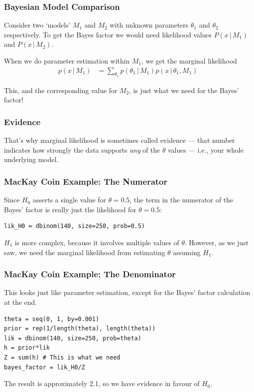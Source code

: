 \documentclass{beamer}
\newcommand{\given}{\,|\,}
\begin{document}
\begin{frame}
\frametitle{Bayesian Model Comparison}
Consider two `models' $M_1$ and $M_2$ with unknown parameters $\theta_1$
and $\theta_2$ respectively. To get the Bayes factor we would need likelihood
values $P(x \given M_1)$ and $P(x \given M_2)$.\\[0.5em]\pause

When we do parameter estimation within $M_1$, we get the marginal likelihood
\begin{align}
p(x \given M_1) &= \sum_{\theta_1} p(\theta_1 \given M_1)p(x \given \theta_1, M_1)
\end{align}

This, and the corresponding value for $M_2$, is just what we need for the Bayes' factor!

\end{frame}

\begin{frame}
\frametitle{Evidence}

That's why marginal likelihood
is sometimes called evidence --- that number indicates how strongly the data supports
{\em any} of the $\theta$ values --- i.e., your whole underlying model.

\end{frame}


\begin{frame}[fragile]
\frametitle{MacKay Coin Example: The Numerator}
Since $H_0$ asserts a single value for $\theta=0.5$, the term in the numerator
of the Bayes' factor is really just the likelihood for $\theta=0.5$:
\begin{verbatim}
lik_H0 = dbinom(140, size=250, prob=0.5)
\end{verbatim}
\pause

$H_1$ is more complex, because it involves multiple values of $\theta$.
However, as we just saw, we need the marginal likelihood from estimating $\theta$ assuming $H_1$.
\end{frame}

\begin{frame}[fragile]
\frametitle{MacKay Coin Example: The Denominator}
This looks just like parameter estimation, except for the Bayes' factor
calculation at the end.
\begin{verbatim}
theta = seq(0, 1, by=0.001)
prior = rep(1/length(theta), length(theta))
lik = dbinom(140, size=250, prob=theta)
h = prior*lik
Z = sum(h) # This is what we need
bayes_factor = lik_H0/Z
\end{verbatim}
\pause
The result is approximately 2.1, so we have evidence in favour of
$H_0$.

\end{frame}
\end{document}
